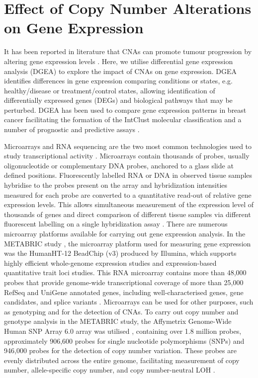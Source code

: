 \section{Effect of Copy Number Alterations on Gene Expression}
It has been reported in literature that CNAs can promote tumour progression by altering gene expression levels \citep{pmid12297621, pmid17289997,  pmid22522925, pmid32024838}. Here, we utilise differential gene expression analysis (DGEA) to explore the impact of CNAs on gene expression. DGEA identifies differences in gene expression comparing conditions or states, e.g. healthy/disease or treatment/control states, allowing identification of differentially expressed genes (DEGs) and biological pathways that may be perturbed. DGEA has been used to compare gene expression patterns in breast cancer facilitating the formation of the IntClust molecular classification and a number of prognostic and predictive assays \citep{pmid22522925, pmid28882552}. 

Microarrays and RNA sequencing are the two most common technologies used to study transcriptional activity \citep{pmid10851158, pmid19015660}. Microarrays contain thousands of probes, usually oligonucleotide or complementary DNA probes, anchored to a glass slide at defined positions. Fluorescently labelled RNA or DNA in observed tissue samples hybridise to the probes present on the array and hybridization intensities measured for each probe are converted to a quantitative read-out of relative gene expression levels. This allows simultaneous measurement of the expression level of thousands of genes and direct comparison of different tissue samples via different fluorescent labelling on a single hybridization assay \citep{pmid10851158, pmid17660860}. There are numerous microarray platforms available for carrying out gene expression analysis. In the METABRIC study \citep{pmid22522925}, the microarray platform used for measuring gene expression was the HumanHT-12 BeadChip (v3) produced by Illumina, which supports highly efficient whole-genome expression studies and expression-based quantitative trait loci studies. This RNA microarray contains more than 48,000 probes that provide genome-wide transcriptional coverage of more than 25,000 RefSeq and UniGene annotated genes, including well-characterised genes, gene candidates, and splice variants \citep{Illumina}. Microarrays can be used for other purposes, such as genotyping and for the detection of CNAs. To carry out copy number and genotype analysis in the METABRIC study, the Affymetrix Genome-Wide Human SNP Array 6.0 array was utilised \citep{pmid22522925}, containing over 1.8 million probes, approximately 906,600 probes for single nucleotide polymorphisms (SNPs) and 946,000 probes for the detection of copy number variation. These probes are evenly distributed across the entire genome, facilitating measurement of copy number, allele-specific copy number, and copy number-neutral LOH \citep{Affy}.  

